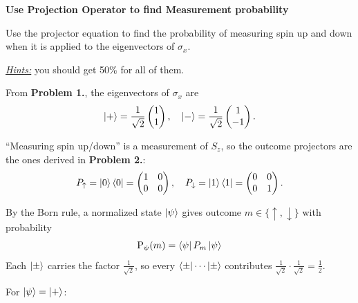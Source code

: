\documentclass[a4paper, 10pt]{article}
\begin{document}
\begin{problem}
\textbf{Use Projection Operator to find Measurement probability}
\par Use the projector equation to find the probability of measuring spin up and down when it is applied to the eigenvectors of \( \sigma_x \).
\par \underline{\textit{Hints:}} you should get 50\% for all of them.
\end{problem}

\begin{solution}
	\noindent From \textbf{Problem 1.}, the eigenvectors of \( \sigma_x \) are
	\[
		\ket{+} = \frac{1}{\sqrt{2}} \begin{pmatrix} 1 \\ 1 \end{pmatrix}, \quad
		\ket{-} = \frac{1}{\sqrt{2}} \begin{pmatrix} 1 \\ -1 \end{pmatrix}.
	\]

	\noindent ``Measuring spin up/down'' is a measurement of \( S_z \), so the outcome projectors are the ones derived in \textbf{Problem 2.}:
	\[
		P_{\uparrow} = \ket{0}\bra{0} = \begin{pmatrix} 1 & 0 \\ 0 & 0 \end{pmatrix}, \quad
		P_{\downarrow} = \ket{1}\bra{1} = \begin{pmatrix} 0 & 0 \\ 0 & 1 \end{pmatrix}.
	\]

	\noindent By the Born rule, a normalized state \( \ket{\psi} \) gives outcome \( m \in \{\uparrow, \downarrow\} \) with probability
	\[
		\text{P}_{\psi}(m) = \bra{\psi} P_m \ket{\psi}
	\]
	Each \( \ket{\pm} \) carries the factor \( \displaystyle \frac{1}{\sqrt{2}} \), so every \( \bra{\pm}\cdots\ket{\pm} \) contributes \( \displaystyle \frac{1}{\sqrt{2}} \cdot \frac{1}{\sqrt{2}} = \frac{1}{2} \).

	\myspace

	\noindent For \( \ket{\psi} = \ket{+} \):


\end{solution}
\end{document}
